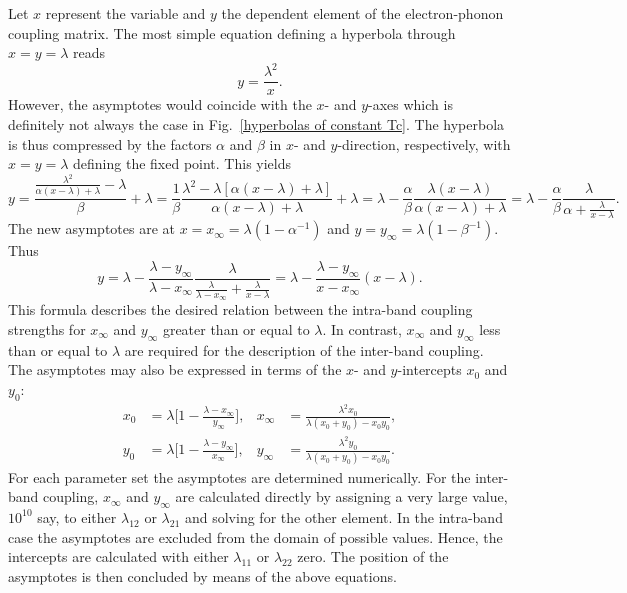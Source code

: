 Let $x$ represent the variable and $y$ the dependent element of the
electron-phonon coupling matrix. The most simple equation defining a hyperbola
through $x = y = \lambda$ reads
%
\begin{equation*}
    y = \frac {\lambda^2} x.
\end{equation*}
%
However, the asymptotes would coincide with the $x$- and $y$-axes which is
definitely not always the case in Fig.~\ref{hyperbolas of constant Tc}. The
hyperbola is thus compressed by the factors $\alpha$ and $\beta$ in $x$- and
$y$-direction, respectively, with $x = y = \lambda$ defining the fixed point.
This yields
%
\begin{equation*}
    y = \frac
        {\frac{\lambda^2} {\alpha (x - \lambda) + \lambda} - \lambda}
        \beta
    + \lambda
    = \frac 1 \beta \frac
        {\lambda^2 - \lambda [\alpha (x - \lambda) + \lambda]}
        {\alpha (x - \lambda) + \lambda}
    + \lambda
    = \lambda - \frac \alpha \beta \frac
        {\lambda (x - \lambda)}
        {\alpha (x - \lambda) + \lambda}
    = \lambda - \frac \alpha \beta \frac
        \lambda
        {\alpha + \frac \lambda {x - \lambda}}.
\end{equation*}
%
The new asymptotes are at $x = x_\infty = \lambda (1 - \alpha^{-1})$ and $y =
y_\infty = \lambda (1 - \beta^{-1})$. Thus
%
\begin{equation*}
    y = \lambda - \frac{\lambda - y_\infty}{\lambda - x_\infty} \frac
        \lambda
        {\frac \lambda {\lambda - x_\infty} + \frac \lambda {x - \lambda}}
    = \lambda - \frac{\lambda - y_\infty}{x - x_\infty} (x - \lambda).
\end{equation*}
%
This formula describes the desired relation between the intra-band coupling
strengths for $x_\infty$ and $y_\infty$ greater than or equal to $\lambda$. In
contrast, $x_\infty$ and $y_\infty$ less than or equal to $\lambda$ are required
for the description of the inter-band coupling. The asymptotes may also be
expressed in terms of the $x$- and $y$-intercepts $x_0$ and $y_0$:
%
\begin{align*}
    x_0 &= \lambda \Big[ 1 - \frac{\lambda - x_\infty}{y_\infty} \Big], &
    x_\infty &= \frac{\lambda^2 x_0}{\lambda (x_0 + y_0) - x_0 y_0}, \\
    y_0 &= \lambda \Big[ 1 - \frac{\lambda - y_\infty}{x_\infty} \Big], &
    y_\infty &= \frac{\lambda^2 y_0}{\lambda (x_0 + y_0) - x_0 y_0}.
\end{align*}
%
For each parameter set the asymptotes are determined numerically. For the
inter-band coupling, $x_\infty$ and $y_\infty$ are calculated directly by
assigning a very large value, $10^{10}$ say, to either $\lambda_{1 2}$ or
$\lambda_{2 1}$ and solving for the other element. In the intra-band case the
asymptotes are excluded from the domain of possible values. Hence, the
intercepts are calculated with either $\lambda_{1 1}$ or $\lambda_{2 2}$ zero.
The position of the asymptotes is then concluded by means of the above
equations.

